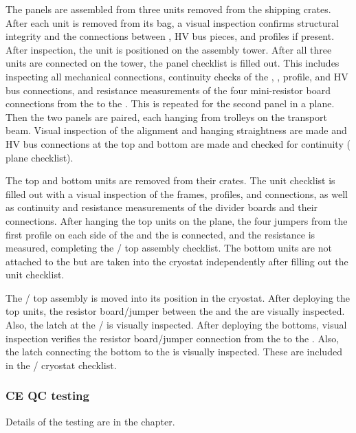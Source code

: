 The  panels are assembled from three units removed from the shipping crates.  
After each unit is removed from its bag, a visual inspection confirms structural integrity and the connections between , HV bus pieces, and profiles if present.  
After inspection, the unit is positioned on the  assembly tower.  
After all three units are connected on the tower, the  panel checklist is filled out.  
This includes inspecting all mechanical connections, continuity checks of the , , profile, and HV bus connections, and resistance measurements of the four mini-resistor board connections from the  to the .  
This is repeated for the second panel in a  plane.  Then the two panels are paired, each hanging from trolleys on the transport beam.  
Visual inspection of the alignment and hanging straightness are made and HV bus connections at the top and bottom are made and checked for continuity ( plane checklist).

The  top and bottom units are removed from their crates.  The  unit checklist is filled out with a visual inspection of the frames, profiles, and connections, as well as continuity and resistance measurements of the divider boards and their connections.  
After hanging the top  units on the  plane, the four jumpers from the first  profile on each side of the  and the   is connected, and the resistance is measured, completing the / top assembly checklist. 
The  bottom units are not attached to the  but are taken into the cryostat independently after filling out the  unit checklist.

The / top assembly is moved into its position in the cryostat.   
After deploying the  top units, the resistor board/jumper between the  and the   are visually inspected.  
Also, the latch at the / is visually inspected.  After deploying the  bottoms, visual inspection verifies the resistor board/jumper connection from the  to the .  
Also, the latch connecting the  bottom to the  is visually inspected.  
These are included in the / cryostat checklist.

\subsubsection{CE QC testing}
Details of the   testing are  in the  chapter.

